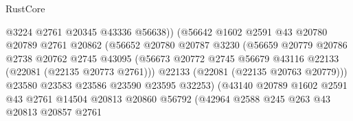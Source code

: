 \begin{lexlean}{RustCore}
\begin{coremodule}
                                      @3224
                                      @2761
                                      @20345
                                      @43336
                                      @56638))
                                  (@56642
                                    @1602
                                    @2591
                                    @43
                                    @20780
                                    @20789
                                    @2761
                                    @20862
                                    (@56652
                                      @20780
                                      @20787
                                      @3230
                                      (@56659
                                        @20779
                                        @20786
                                        @2738
                                        @20762
                                        @2745
                                        @43095
                                        (@56673
                                          @20772
                                          @2745
                                          @56679
                                          @43116
                                          @22133
                                          (@22081 (@22135 @20773 @2761)))
                                        @22133
                                        (@22081 (@22135 @20763 @20779)))
                                      @23580
                                      @23583
                                      @23586
                                      @23590
                                      @23595
                                      @32253)
                                    (@43140
                                      @20789
                                      @1602
                                      @2591
                                      @43
                                      @2761
                                      @14504
                                      @20813
                                      @20860
                                      @56792
                                      (@42964
                                        @2588
                                        @245
                                        @263
                                        @43
                                        @20813
                                        @20857
                                        @2761

\end{coremodule}
\end{lexlean}
